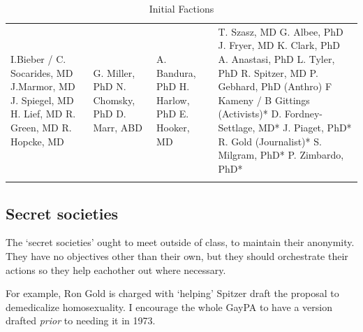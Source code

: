 \begin{refsection}
 \begin{longtable}[!t]{ | P{2.75cm} | P{3cm} | P{3cm} | P{4.25cm} | }
\hline
{} &  &  &  \\ \hline
I.Bieber / C. Socarides, MD \newline
J.Marmor, MD \newline
J. Spiegel, MD \newline
H. Lief, MD \newline
R. Green, MD \newline
R. Hopcke, MD &
G. Miller, PhD \newline
N. Chomsky, PhD \newline
D. Marr, ABD &
A. Bandura, PhD \newline
H. Harlow, PhD \newline
E. Hooker, MD \newline &
T. Szasz, MD\newline
G. Albee, PhD\newline
J. Fryer, MD\newline
K. Clark, PhD\newline
A. Anastasi, PhD\newline
L. Tyler, PhD\newline
R. Spitzer, MD\newline
P. Gebhard, PhD (Anthro)\newline
F Kameny / B Gittings (Activists)*\newline
D. Fordney-Settlage, MD*\newline
J. Piaget, PhD*\newline
R. Gold (Journalist)*\newline
S. Milgram, PhD*\newline
P. Zimbardo, PhD*\newline \\ \hline
\caption{Initial Factions}
\label{table: factions}
\end{longtable}


\subsection{Secret societies}
\label{secretsocieties}

The `secret societies' ought to meet outside of class, to maintain their anonymity. They have no objectives other than their own, but they should orchestrate their actions so they help eachother out where necessary.

For example, Ron Gold is charged with `helping' Spitzer draft the proposal to demedicalize homosexuality. I encourage the whole GayPA to have a version drafted \emph{prior} to needing it in 1973.


\end{refsection}
